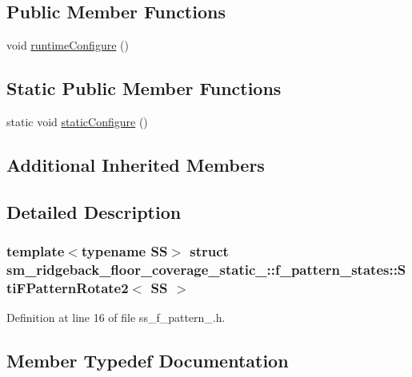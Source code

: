 \subsection*{Public Member Functions}
\begin{DoxyCompactItemize}
\item 
void \hyperlink{classsm__ridgeback__floor__coverage__static__1_1_1f__pattern__states_1_1StiFPatternRotate2_acd6760ac17d8033799f9807e8f7ba00c}{runtime\+Configure} ()
\end{DoxyCompactItemize}
\subsection*{Static Public Member Functions}
\begin{DoxyCompactItemize}
\item 
static void \hyperlink{classsm__ridgeback__floor__coverage__static__1_1_1f__pattern__states_1_1StiFPatternRotate2_a27ba4fa5e0413a5c48bdbbe8f9f9a3a2}{static\+Configure} ()
\end{DoxyCompactItemize}
\subsection*{Additional Inherited Members}


\subsection{Detailed Description}
\subsubsection*{template$<$typename SS$>$\newline
struct sm\+\_\+ridgeback\+\_\+floor\+\_\+coverage\+\_\+static\+\_\+::f\+\_\+pattern\+\_\+states\+::\+Sti\+F\+Pattern\+Rotate2$<$ S\+S $>$}



Definition at line 16 of file ss\+\_\+f\+\_\+pattern\+\_.\+h.



\subsection{Member Typedef Documentation}
\mbox{\label{classsm__ridgeback__floor__coverage__static__1_1_1f__pattern__states_1_1StiFPatternRotate2_adc889d5fb137e13d27696f9530dc49b9}} 

